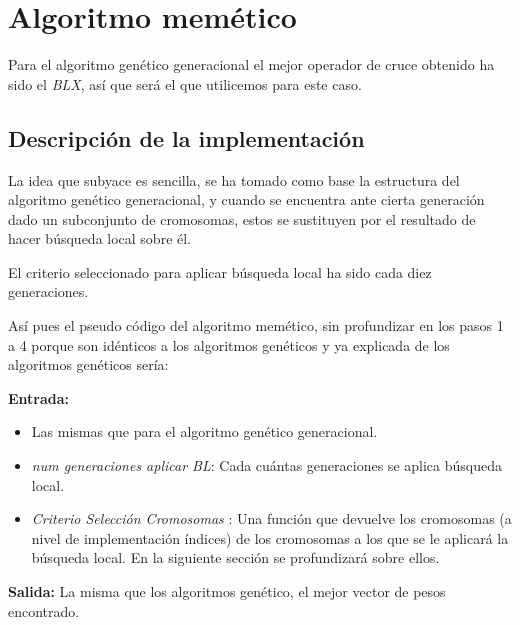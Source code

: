 
\section{Algoritmo memético}  

Para el algoritmo genético generacional el mejor operador de cruce obtenido ha sido el \textit{BLX}, así que será el que utilicemos para este caso. 

\subsection{Descripción de la implementación}  

La idea que subyace es sencilla, se ha tomado como base la estructura del algoritmo genético generacional,
 y cuando se encuentra ante cierta generación dado un subconjunto 
 de cromosomas, estos se sustituyen por el resultado de hacer 
 búsqueda local sobre él. 

El criterio seleccionado para aplicar búsqueda local ha sido cada diez generaciones.

Así pues el pseudo código del algoritmo memético, sin profundizar  en los pasos 1 a 4 porque son idénticos a los algoritmos genéticos y ya explicada de los algoritmos genéticos sería: 

\textbf{ Entrada:} 
\begin{itemize}
    \item Las mismas que para el algoritmo genético generacional.
    \item \textit{num generaciones aplicar BL}: Cada cuántas generaciones se aplica búsqueda local. 
    \item \textit{ Criterio Selección  Cromosomas }: Una función que devuelve los cromosomas (a nivel de implementación índices) de los cromosomas a los que se le aplicará la búsqueda local. En la siguiente sección se profundizará sobre ellos. 
\end{itemize}

\textbf{Salida:} La misma que los algoritmos genético, el mejor vector de pesos encontrado.  

